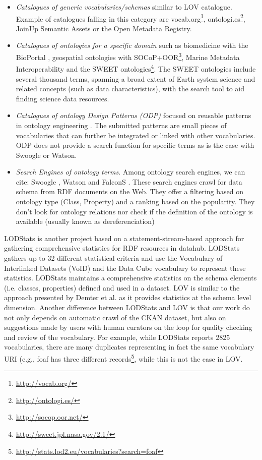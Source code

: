 \documentclass{iosart2c}
\begin{document}
\begin{itemize}
 \item \textit{Catalogues of generic vocabularies/schemas} similar to LOV catalogue. Example of catalogues falling in this category are vocab.org\footnote{\url{http://vocab.org/}}, ontologi.es\footnote{\url{http://ontologi.es/}}, JoinUp Semantic Assets or the Open Metadata Registry.
 \item \textit{Catalogues of ontologies for a specific domain} such as biomedicine with the BioPortal \cite{bioportal11}, geospatial ontologies with SOCoP+OOR\footnote{\url{http://socop.oor.net/}}, Marine Metadata Interoperability and the SWEET \cite{sweet05} ontologies\footnote{\url{http://sweet.jpl.nasa.gov/2.1/}}. The SWEET ontologies include several thousand terms, spanning a broad extent of Earth system science and related concepts (such as data characteristics), with the search tool to aid finding science data resources. 
 \item \textit{Catalogues of ontology Design Patterns (ODP)} focused on reusable patterns in ontology engineering \cite{presutti08}. The submitted patterns are small pieces of vocabularies that can further be integrated or linked with other vocabularies. ODP does not provide a search function for specific terms as is the case with Swoogle or Watson.
 \item \textit{Search Engines of ontology terms}. Among ontology search engines, we can cite: Swoogle \cite{finin2005swoogle}, Watson \cite{d2007watson,Sabou07} and FalconS \cite{cheng2008falcons}. These search engines crawl for data schema from RDF documents on the Web. They offer a filtering based on ontology type (Class, Property) and a ranking based on the popularity. They don't look for ontology relations nor check if the definition of the ontology is available (usually known as dereferenciation)
\end{itemize}

LODStats \cite{demter-2012-ekaw} is another project based on a statement-stream-based approach for gathering comprehensive statistics for RDF resources in datahub. LODStats gathers up to 32 different statistical criteria and use the Vocabulary of Interlinked Datasets (VoID)\cite{void2009} and the Data Cube vocabulary to represent these statistics. LODStats maintains a comprehensive statistics on the schema elements (i.e. classes, properties) defined and used in a dataset. LOV is similar to the approach presented by Demter et al. as it provides statistics at the schema level dimension. Another difference between LODStats and LOV is that our work do not only depends on automatic crawl of the CKAN dataset, but also on suggestions made by users with human curators on the loop for quality checking and review of the vocabulary. For example, while LODStats reports 2825 vocabularies, there are many duplicates representing in fact the same vocabulary URI (e.g., foaf has three different records\footnote{\url{http://stats.lod2.eu/vocabularies?search=foaf}}, while this is not the case in LOV. %
\end{document}
